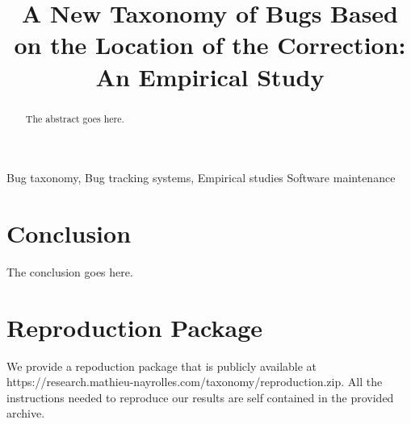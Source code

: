 \documentclass[journal]{IEEEtran}
\begin{document}
\title{A New Taxonomy of Bugs Based on the Location of the Correction: An Empirical Study}

\author{



}


\maketitle

\begin{abstract}
The abstract goes here.
\end{abstract}

\begin{IEEEkeywords}
Bug taxonomy, Bug tracking systems, Empirical studies
Software maintenance
\end{IEEEkeywords}


\IEEEpeerreviewmaketitle







\section{Conclusion}
The conclusion goes here.

\section{Reproduction Package}

We provide a repoduction package that is publicly available at https://research.mathieu-nayrolles.com/taxonomy/reproduction.zip.
All the instructions needed to reproduce our results are self contained in the provided archive.


% 

\clearpage 

\ifCLASSOPTIONcaptionsoff
  \newpage
\fi



\end{document}
